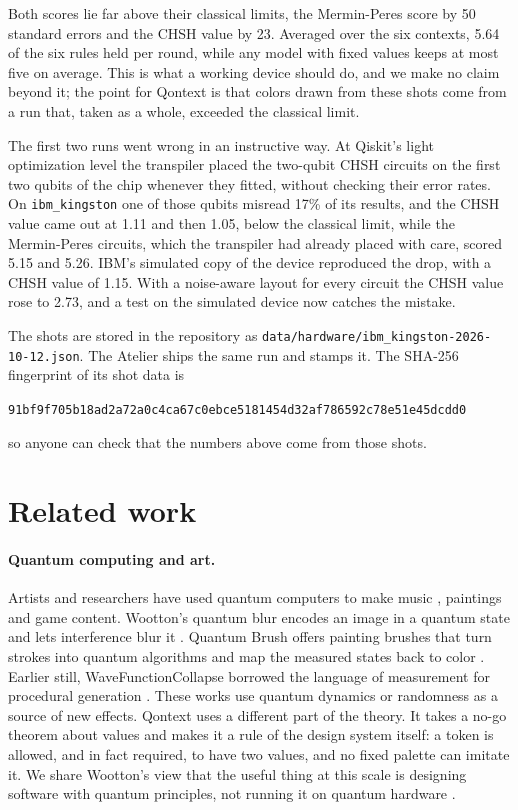 \documentclass[11pt,a4paper]{article}
\theoremstyle{qresult}
\begin{document}
Both scores lie far above their classical limits, the Mermin-Peres score by 50 standard errors and the CHSH value by
23. Averaged over the six contexts, 5.64 of the six rules held per round, while any model with fixed values keeps at
most five on average. This is what a working device should do, and we make no claim beyond it; the point for Qontext
is that colors drawn from these shots come from a run that, taken as a whole, exceeded the classical limit.

The first two runs went wrong in an instructive way. At Qiskit's light optimization level the transpiler placed the
two-qubit CHSH circuits on the first two qubits of the chip whenever they fitted, without checking their error rates.
On \texttt{ibm\_kingston} one of those qubits misread 17\% of its results, and the CHSH value came out at 1.11 and
then 1.05, below the classical limit, while the Mermin-Peres circuits, which the transpiler had already placed with
care, scored 5.15 and 5.26. IBM's simulated copy of the device reproduced the drop, with a CHSH value of 1.15. With a noise-aware layout
for every circuit the CHSH value rose to 2.73, and a test on the simulated device now catches the mistake.

The shots are stored in the repository as \nolinkurl{data/hardware/ibm_kingston-2026-10-12.json}. The Atelier ships
the same run and stamps it. The SHA-256 fingerprint of its shot data is
\begin{center}\small\texttt{91bf9f705b18ad2a72a0c4ca67c0ebce5181454d32af786592c78e51e45dcdd0}\end{center}
so anyone can check that the numbers above come from those shots.

\section{Related work}
\label{sec:related}

\paragraph{Quantum computing and art.} Artists and researchers have used quantum computers to make music
\citep{miranda2022}, paintings \citep{crippa2024} and game content. Wootton's quantum blur encodes an image in a
quantum state and lets interference blur it \citep{wootton2020}. Quantum Brush offers painting brushes that turn strokes into
quantum algorithms and map the measured states back to color \citep{ferreira2025}. Earlier still,
WaveFunctionCollapse borrowed the language of measurement for procedural generation \citep{gumin2016}. These works use
quantum dynamics or randomness as a source of new effects. Qontext uses a different part of the theory. It takes a
no-go theorem about values and makes it a rule of the design system itself: a token is allowed, and in fact required,
to have two values, and no fixed palette can imitate it. We share Wootton's view that the useful thing at this scale is
designing software with quantum principles, not running it on quantum hardware \citep{wootton2020}.
\end{document}

